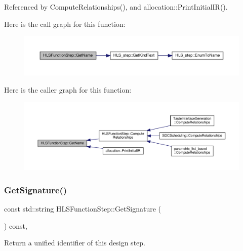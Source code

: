 Referenced by Compute\+Relationships(), and allocation\+::\+Print\+Initial\+I\+R().

Here is the call graph for this function\+:
\nopagebreak
\begin{figure}[H]
\begin{center}
\leavevmode
\includegraphics[width=350pt]{d9/d41/classHLSFunctionStep_ab070622813a99accede9dd5f6ba5a3cb_cgraph}
\end{center}
\end{figure}
Here is the caller graph for this function\+:
\nopagebreak
\begin{figure}[H]
\begin{center}
\leavevmode
\includegraphics[width=350pt]{d9/d41/classHLSFunctionStep_ab070622813a99accede9dd5f6ba5a3cb_icgraph}
\end{center}
\end{figure}
\mbox{\label{classHLSFunctionStep_a8f40b68d392790017292410850088887}} 
\subsubsection{\texorpdfstring{Get\+Signature()}{GetSignature()}}
{\footnotesize\ttfamily const std\+::string H\+L\+S\+Function\+Step\+::\+Get\+Signature (\begin{DoxyParamCaption}{ }\end{DoxyParamCaption}) const\hspace{0.3cm}{\ttfamily [override]}, {\ttfamily [virtual]}}



Return a unified identifier of this design step. 

